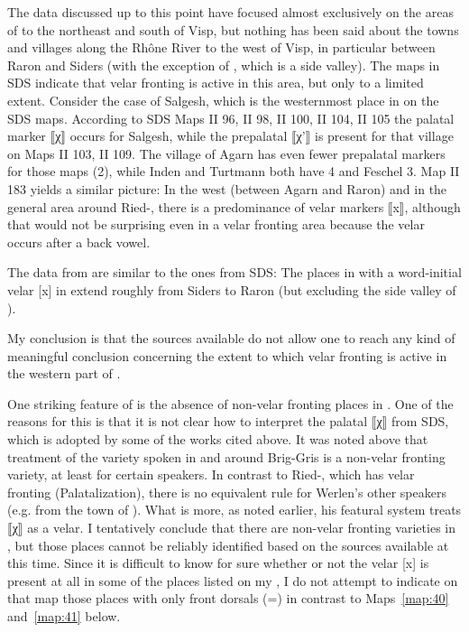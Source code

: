 {The data discussed up to this point have focused almost exclusively on the areas of  to the northeast and south of Visp, but nothing has been said about the towns and villages along the Rhône River to the west of Visp, in particular between Raron and Siders (with the exception of , which is a side valley). The maps in SDS indicate that velar fronting is active in this area, but only to a limited extent. Consider the case of Salgesh, which is the westernmost place in  on the SDS maps. According to SDS Maps II 96, II 98, II 100, II 104, II 105 the palatal marker ⟦χ⟧ occurs for Salgesh, while the prepalatal ⟦χ'⟧ is present for that village on Maps II 103, II 109. The village of Agarn has even fewer prepalatal markers for those maps (2), while Inden and Turtmann both have 4 and Feschel 3. Map II 183 yields a similar picture: In the west (between Agarn and Raron) and in the general area around Ried-, there is a predominance of velar markers ⟦x⟧, although that would not be surprising even in a velar fronting area because the velar occurs after a back vowel.

The data from \citet{Rübel1950} are similar to the ones from SDS: The places in  with a word-initial velar [x] in  extend roughly from Siders to Raron (but excluding the side valley of ).

My conclusion is that the sources available do not allow one to reach any kind of meaningful conclusion concerning the extent to which velar fronting is active in the western part of .

One striking feature of  is the absence of non-velar fronting places in . One of the reasons for this is that it is not clear how to interpret the palatal ⟦χ⟧ from SDS, which is adopted by some of the works cited above. It was noted above that  treatment of the variety spoken in and around Brig-Gris is a non-velar fronting variety, at least for certain speakers. In contrast to Ried-, which has velar fronting (Palatalization), there is no equivalent rule for Werlen’s other speakers (e.g. from the town of ). What is more, as noted earlier, his featural system treats ⟦χ⟧ as a velar. I tentatively conclude that there are non-velar fronting varieties in , but those places cannot be reliably identified based on the sources available at this time. Since it is difficult to know for sure whether or not the velar [x] is present at all in some of the places listed on my , I do not attempt to indicate on that map those places with only front dorsals (=) in contrast to Maps~\ref{map:40} and~\ref{map:41} below.

}
